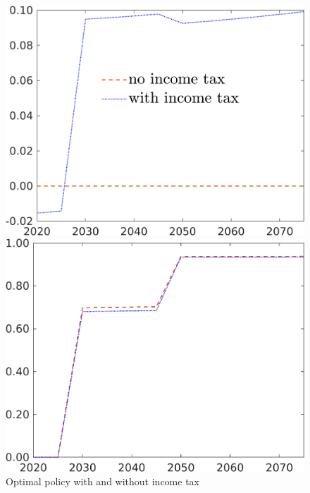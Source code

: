 \begin{figure}[h!!]
	\centering
	\caption{Optimal policy with and without income tax}\label{fig:comp_nored_pol}
	
	\begin{minipage}[]{0.32\textwidth}
		\includegraphics[width=1\textwidth]{../../codding_model/own_basedOnFried/optimalPol_190722_tidiedUp/figures/all_July22/taul_DDCompEffOPT_T_NoTaus_pol3_spillover0_noskill0_sep1_xgrowth0_etaa0.79_lgd1_lff0.png}
	\end{minipage}
	\begin{minipage}[]{0.32\textwidth}
		\includegraphics[width=1\textwidth]{../../codding_model/own_basedOnFried/optimalPol_190722_tidiedUp/figures/all_July22/tauf_DDCompEffOPT_T_NoTaus_pol3_spillover0_noskill0_sep1_xgrowth0_etaa0.79_lgd0_lff0.png}

\end{minipage}
\end{figure}
